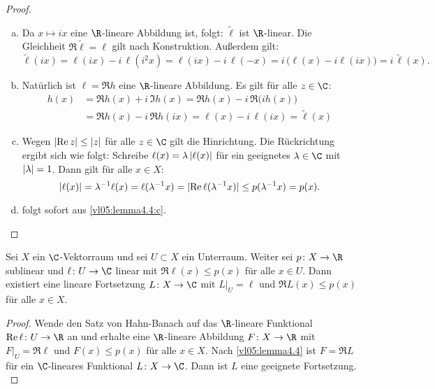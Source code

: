 \begin{proof}\hfill
    \begin{enumerate}[(a)]
        \item
            Da $x\mapsto ix$ eine $\R$-lineare Abbildung ist, folgt:
            $\tilde\ell$ ist $\R$-linear. Die Gleichheit $\Re\tilde\ell = \ell$
            gilt nach Konstruktion. Außerdem gilt:
            \[ \tilde\ell(ix) = \ell(ix) - i\,\ell(i^2x) = \ell(ix) -
                i\,\ell(-x) = i\,\bigl( \ell(x) - i \ell(ix) \bigr)
                = i\,\tilde\ell(x)
            . \]
        \item
            Natürlich ist $\ell=\Re h$ eine $\R$-lineare Abbildung. Es gilt
            für alle $z\in\C$:
            \begin{align*}
                h(x) 
                &= \Re h(x) + i\, \Im h(x)                  %
                 = \Re h(x) - i\, \Re\bigl( i h(x) \bigr)   \\
                &= \Re h(x) - i\, \Re h(ix)                 %
                 = \ell(x) - i\, \ell(ix) = \tilde\ell(x)
            \end{align*}
        \item
            Wegen $\lvert\operatorname{Re} z\rvert \leq \lvert z\rvert$ für alle $z\in\C$ gilt die
            Hinrichtung. Die Rückrichtung ergibt sich wie folgt: Schreibe
            $\ell(x) = \lambda \, \lvert\ell(x)\rvert$ für ein geeignetes
            $\lambda\in\C$ mit $\lvert\lambda\rvert=1$.
            Dann gilt für alle $x\in X$:
            \[ \lvert\ell(x)\rvert = \lambda^{-1} \ell(x) = \ell(\lambda^{-1} x)
                = \lvert\operatorname{Re} \ell(\lambda^{-1} x)\rvert  \leq p(\lambda^{-1} x)
                = p(x)
            . \]
        \item
            folgt sofort aus \ref{vl05:lemma4.4:c}.
            \\
            \qedhere %
    \end{enumerate}
\end{proof}

\begin{thSatz} \label{vl05:satz4.5}
    Sei $X$ ein $\C$-Vektorraum und sei $U\subset X$ ein Unterraum. Weiter sei
    $p\colon X\to\R$ sublinear und $\ell\colon U\to\C$ linear mit 
    $\Re\ell(x)\leq p(x)$ für alle $x\in U$. Dann existiert eine lineare
    Fortsetzung $L\colon X\to\C$ mit $L\vert_U=\ell$ und $\Re L(x) \leq p(x)$
    für alle $x\in X$.
\end{thSatz}

\begin{proof}
    Wende den Satz von Hahn-Banach 
    auf das $\R$-lineare Funktional $\Re\ell\colon U\to\R$ an und erhalte eine
    $\R$-lineare Abbildung $F\colon X\to\R$ mit $F\vert_U=\Re\ell$ und $F(x)\leq
    p(x)$ für alle $x\in X$. Nach \cref{vl05:lemma4.4} ist $F=\Re L$ für ein
    $\C$-lineares Funktional $L\colon X\to\C$. Dann ist $L$ eine
    geeignete Fortsetzung.
    \\
\end{proof}

